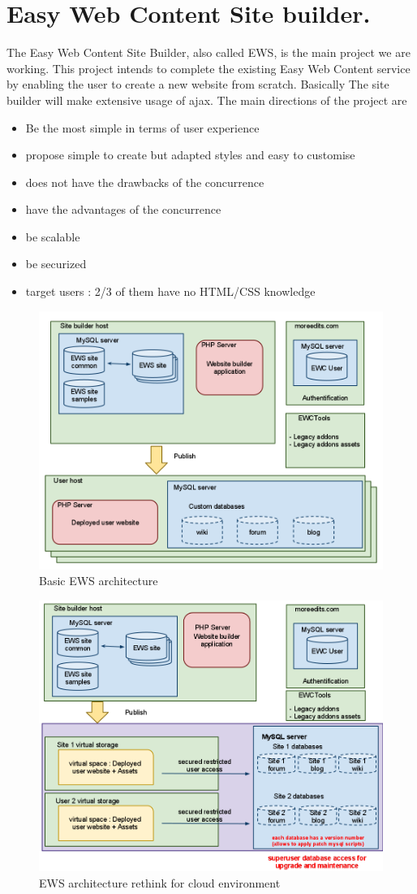 \chapter{Easy Web Content Site builder.}

The Easy Web Content Site Builder, also called EWS, is the main project we are working. This project intends to complete the existing Easy Web Content service by enabling the user to create a new website from scratch.
Basically The site builder will make extensive usage of ajax. The main directions of the project are
\begin{itemize}
\item Be the most simple in terms of user experience
\item propose simple to create but adapted styles and easy to customise
\item does not have the drawbacks of the concurrence
\item have the advantages of the concurrence
\item be scalable
\item be securized
\item target users : 2/3 of them have no HTML/CSS knowledge
\end{itemize}


\begin{figure}
  \begin{center}
    \includegraphics[width=.40\textwidth]{img/ews_archi_before.png}
  \end{center}
\caption{Basic EWS architecture }
\end{figure}

\begin{figure}
  \begin{center}
    \includegraphics[width=.40\textwidth]{img/ews_archi_after.png}
  \end{center}
\caption{EWS architecture rethink for cloud environment}
\end{figure}

